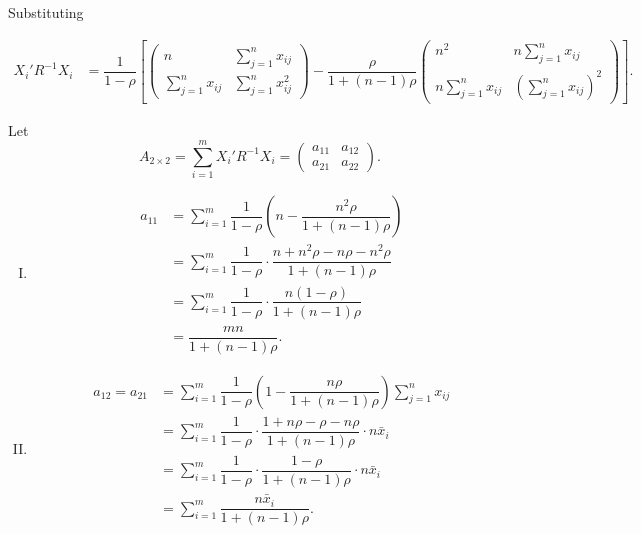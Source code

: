 \documentclass[11pt, a4paper]{article}
\begin{document}
\begin{itemize}
\newpage

Substituting

\begin{align*}
X_i'R^{-1}X_i &=
\dfrac{1}{1-\rho}
\left[
\begin{pmatrix}
n & \sum\limits_{j=1}^{n} x_{ij} \\
\sum\limits_{j=1}^{n} x_{ij} & \sum\limits_{j=1}^{n} x_{ij}^2
\end{pmatrix}
-
\dfrac{\rho}{1+(n-1)\rho}
\begin{pmatrix}
n^2 & n \sum\limits_{j=1}^{n} x_{ij} \\
n \sum\limits_{j=1}^{n} x_{ij} & \left(\sum\limits_{j=1}^{n} x_{ij}\right)^2
\end{pmatrix}
\right].
\end{align*}

Let $$A_{2 \times 2} = \sum \limits_{i = 1}^{m} X_i'R^{-1}X_i = \begin{pmatrix}
a_{11} & a_{12} \\
a_{21} & a_{22}
\end{pmatrix}.$$

\begin{enumerate}[I.]
\item \begin{align*}
a_{11} 
&= \sum\limits_{i=1}^{m} \dfrac{1}{1-\rho}
\left(
n - \dfrac{n^2 \rho}{1+(n-1)\rho}
\right) \\[6pt]
&= \sum\limits_{i=1}^{m} \dfrac{1}{1-\rho}
\cdot
\dfrac{n + n^2 \rho - n\rho - n^2 \rho}{1+(n-1)\rho} \\[6pt]
&= \sum\limits_{i=1}^{m} \dfrac{1}{1-\rho}
\cdot
\dfrac{n(1-\rho)}{1+(n-1)\rho} \\[6pt]
&= \dfrac{mn}{1+(n-1)\rho}.
\end{align*}

\item \begin{align*}
a_{12} = a_{21}
&= \sum\limits_{i=1}^{m} \dfrac{1}{1-\rho}
\left(
1 - \dfrac{n\rho}{1+(n-1)\rho}
\right)
\sum\limits_{j=1}^{n} x_{ij} \\[6pt]
&= \sum\limits_{i=1}^{m} \dfrac{1}{1-\rho}
\cdot
\dfrac{1 + n\rho - \rho - n\rho}{1+(n-1)\rho}
\cdot n\bar{x}_i \\[6pt]
&= \sum\limits_{i=1}^{m} \dfrac{1}{1-\rho}
\cdot
\dfrac{1-\rho}{1+(n-1)\rho}
\cdot n\bar{x}_i \\[6pt]
&= \sum\limits_{i=1}^{m}
\dfrac{n\bar{x}_i}{1+(n-1)\rho}.
\end{align*}


\end{enumerate}
\end{itemize}
\end{document}
